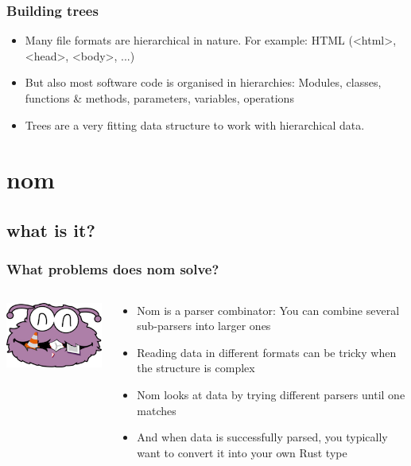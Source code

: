 \documentclass[a4paper]{beamer}
\begin{document}
\begin{frame}\frametitle{Building trees}
\begin{itemize}
 \item Many file formats are hierarchical in nature. For example: HTML (<html>, <head>, <body>, ...)
 \item But also most software code is organised in hierarchies: Modules, classes, functions \& methods, parameters, variables, operations
 \item Trees are a very fitting data structure to work with hierarchical data.
\end{itemize}
\end{frame}

\section{nom}
\subsection{what is it?}

\begin{frame}\frametitle{What problems does nom solve?}
\begin{columns}
\begin{column}{.3\textwidth}
\includegraphics[scale=0.5]{nom.png}
\end{column}
\begin{column}{.7\textwidth}
\begin{itemize}
\item Nom is a parser combinator: You can combine several sub-parsers into larger ones
\item Reading data in different formats can be tricky when the structure is complex
\item Nom looks at data by trying different parsers until one matches
\item And when data is successfully parsed, you typically want to convert it into your own Rust type
\end{itemize}
\end{column}
\end{columns}

\end{frame}
\end{document}
